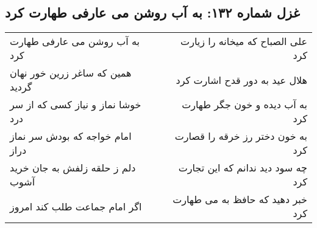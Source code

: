 \begin{center}
\section*{غزل شماره ۱۳۲: به آب روشن می عارفی طهارت کرد}
\label{sec:sh132}
\begin{longtable}{l p{0.5cm} r}
به آب روشن می عارفی طهارت کرد
&&
علی الصباح که میخانه را زیارت کرد
\\
همین که ساغر زرین خور نهان گردید
&&
هلال عید به دور قدح اشارت کرد
\\
خوشا نماز و نیاز کسی که از سر درد
&&
به آب دیده و خون جگر طهارت کرد
\\
امام خواجه که بودش سر نماز دراز
&&
به خون دختر رز خرقه را قصارت کرد
\\
دلم ز حلقه زلفش به جان خرید آشوب
&&
چه سود دید ندانم که این تجارت کرد
\\
اگر امام جماعت طلب کند امروز
&&
خبر دهید که حافظ به می طهارت کرد
\\
\end{longtable}
\end{center}
